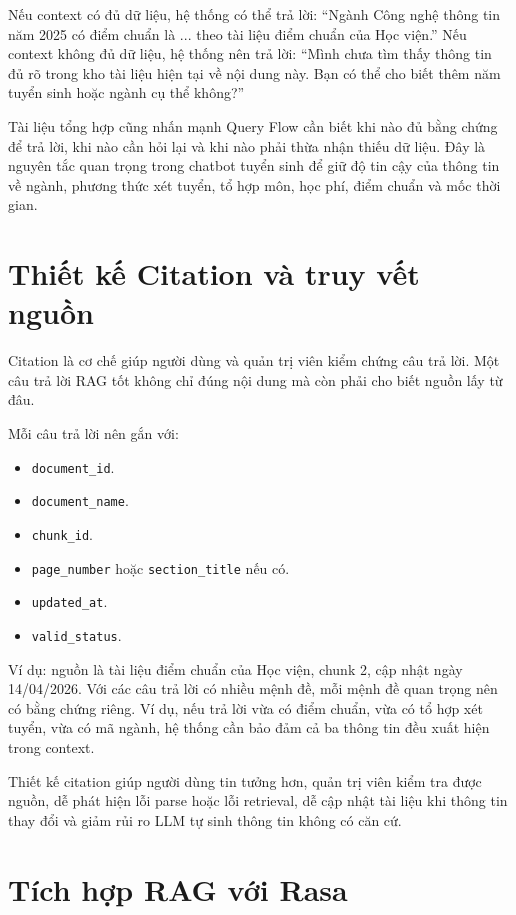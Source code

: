Nếu context có đủ dữ liệu, hệ thống có thể trả lời: ``Ngành Công nghệ thông tin năm 2025 có điểm chuẩn là ... theo tài liệu điểm chuẩn của Học viện.'' Nếu context không đủ dữ liệu, hệ thống nên trả lời: ``Mình chưa tìm thấy thông tin đủ rõ trong kho tài liệu hiện tại về nội dung này. Bạn có thể cho biết thêm năm tuyển sinh hoặc ngành cụ thể không?''

Tài liệu tổng hợp cũng nhấn mạnh Query Flow cần biết khi nào đủ bằng chứng để trả lời, khi nào cần hỏi lại và khi nào phải thừa nhận thiếu dữ liệu. Đây là nguyên tắc quan trọng trong chatbot tuyển sinh để giữ độ tin cậy của thông tin về ngành, phương thức xét tuyển, tổ hợp môn, học phí, điểm chuẩn và mốc thời gian.

\section{Thiết kế Citation và truy vết nguồn}

Citation là cơ chế giúp người dùng và quản trị viên kiểm chứng câu trả lời. Một câu trả lời RAG tốt không chỉ đúng nội dung mà còn phải cho biết nguồn lấy từ đâu.

Mỗi câu trả lời nên gắn với:

\begin{itemize}
    \item \texttt{document\_id}.
    \item \texttt{document\_name}.
    \item \texttt{chunk\_id}.
    \item \texttt{page\_number} hoặc \texttt{section\_title} nếu có.
    \item \texttt{updated\_at}.
    \item \texttt{valid\_status}.
\end{itemize}

Ví dụ: nguồn là tài liệu điểm chuẩn của Học viện, chunk 2, cập nhật ngày 14/04/2026. Với các câu trả lời có nhiều mệnh đề, mỗi mệnh đề quan trọng nên có bằng chứng riêng. Ví dụ, nếu trả lời vừa có điểm chuẩn, vừa có tổ hợp xét tuyển, vừa có mã ngành, hệ thống cần bảo đảm cả ba thông tin đều xuất hiện trong context.

Thiết kế citation giúp người dùng tin tưởng hơn, quản trị viên kiểm tra được nguồn, dễ phát hiện lỗi parse hoặc lỗi retrieval, dễ cập nhật tài liệu khi thông tin thay đổi và giảm rủi ro LLM tự sinh thông tin không có căn cứ.

\section{Tích hợp RAG với Rasa}

